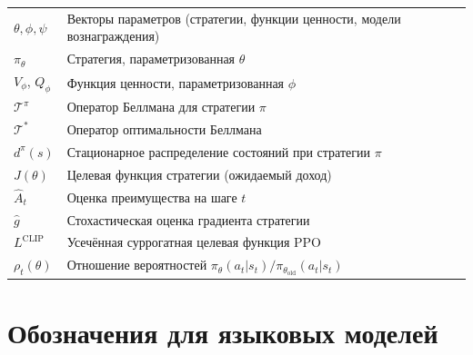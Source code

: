 \begin{center}
\begin{tabular}{@{}ll@{}}
$\theta, \phi, \psi$  & Векторы параметров (стратегии, функции ценности, модели вознаграждения) \\
$\pi_\theta$        & Стратегия, параметризованная $\theta$ \\
$V_\phi$, $Q_\phi$  & Функция ценности, параметризованная $\phi$ \\
$\mathcal{T}^\pi$   & Оператор Беллмана для стратегии $\pi$ \\
$\mathcal{T}^*$     & Оператор оптимальности Беллмана \\
$d^\pi(s)$          & Стационарное распределение состояний при стратегии $\pi$ \\
$J(\theta)$         & Целевая функция стратегии (ожидаемый доход) \\
$\hat{A}_t$         & Оценка преимущества на шаге $t$ \\
$\hat{g}$           & Стохастическая оценка градиента стратегии \\
$L^\mathrm{CLIP}$   & Усечённая суррогатная целевая функция PPO \\
$\rho_t(\theta)$    & Отношение вероятностей $\pi_\theta(a_t|s_t)/\pi_{\theta_\mathrm{old}}(a_t|s_t)$ \\
\bottomrule
\end{tabular}
\end{center}

\section*{Обозначения для языковых моделей}

